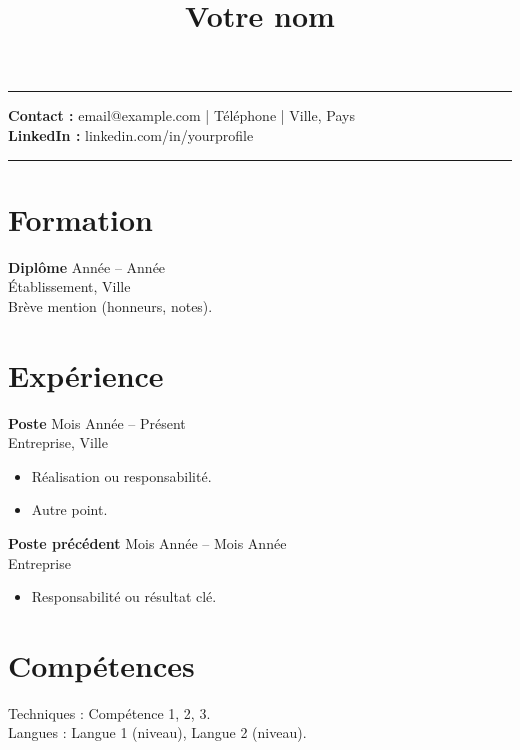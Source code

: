\documentclass[11pt,a4paper]{article}
\title{\vspace{-1.2cm}\textbf{Votre nom}}
\author{}
\date{}
\begin{document}
\maketitle
\vspace{-0.8cm}
\begin{flushright}\rule{2.2cm}{2.8cm}\end{flushright}

\textbf{Contact :} email@example.com \quad | \quad Téléphone \quad | \quad Ville, Pays \\
\textbf{LinkedIn :} linkedin.com/in/yourprofile

\vspace{0.4cm}
\noindent\rule{\textwidth}{0.4pt}

\section*{Formation}
\textbf{Diplôme} \hfill Année -- Année \\
Établissement, Ville \\
Brève mention (honneurs, notes).

\section*{Expérience}
\textbf{Poste} \hfill Mois Année -- Présent \\
Entreprise, Ville \\
\begin{itemize}
  \item Réalisation ou responsabilité.
  \item Autre point.
\end{itemize}

\textbf{Poste précédent} \hfill Mois Année -- Mois Année \\
Entreprise \\
\begin{itemize}
  \item Responsabilité ou résultat clé.
\end{itemize}

\section*{Compétences}
Techniques : Compétence 1, 2, 3. \\
Langues : Langue 1 (niveau), Langue 2 (niveau).
\end{document}
